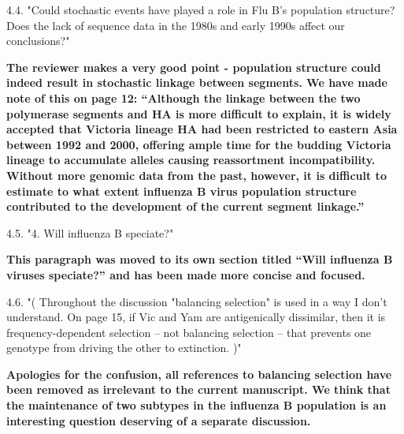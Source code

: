 \documentclass[11pt,oneside,letterpaper]{article}
\begin{document}
4.4. "Could stochastic events have played a role in Flu B's population structure?
Does the lack of sequence data in the 1980s and early 1990s affect our conclusions?"

\textbf{The reviewer makes a very good point - population structure could indeed result in stochastic linkage between segments.
We have made note of this on page 12:
``Although the linkage between the two polymerase segments and HA is more difficult to explain, it is widely accepted that Victoria lineage HA had been restricted to eastern Asia between 1992 and 2000, offering ample time for the budding Victoria lineage to accumulate alleles causing reassortment incompatibility.
Without more genomic data from the past, however, it is difficult to estimate to what extent influenza B virus population structure contributed to the development of the current segment linkage.''}

4.5. "4. Will influenza B speciate?"

\textbf{This paragraph was moved to its own section titled ``Will influenza B viruses speciate?'' and has been made more concise and focused.}

4.6. "( Throughout the discussion "balancing selection" is used in a way I don't understand.
On page 15, if Vic and Yam are antigenically dissimilar, then it is frequency-dependent selection -- not balancing selection -- that prevents one genotype from driving the other to extinction. )"

\textbf{Apologies for the confusion, all references to balancing selection have been removed as irrelevant to the current manuscript.
We think that the maintenance of two subtypes in the influenza B population is an interesting question deserving of a separate discussion.}
\end{document}
